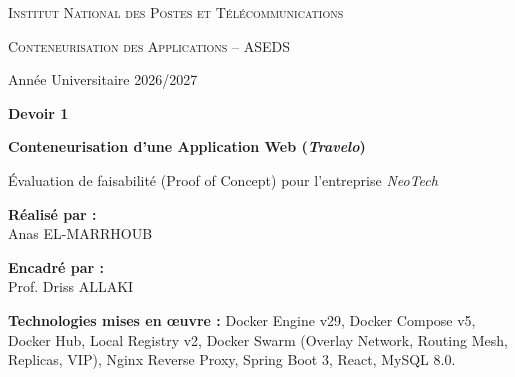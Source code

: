 \documentclass[11pt,a4paper]{article}
\begin{document}
\begin{titlepage}
  \centering
  {\scshape\LARGE Institut National des Postes et Télécommunications \par}
  \vspace{0.4cm}
  {\scshape\large Conteneurisation des Applications -- ASEDS \par}
  \vspace{0.2cm}
  {\large Année Universitaire 2026/2027 \par}
  \vspace{1.8cm}
  
  \begin{tcolorbox}[colback=inptblue, colframe=inptblue, arc=4mm, halign=center]
    \color{white}
    \vspace{0.5cm}
    {\Huge\bfseries Devoir 1 \par}
    \vspace{0.4cm}
    {\Large\bfseries Conteneurisation d'une Application Web (\textit{Travelo}) \par}
    \vspace{0.3cm}
    {\large Évaluation de faisabilité (Proof of Concept) pour l'entreprise \textit{NeoTech} \par}
    \vspace{0.5cm}
  \end{tcolorbox}
  
  \vspace{2.5cm}
  
  \begin{minipage}{0.48\textwidth}
    \begin{flushleft} \large
      \textbf{Réalisé par :}\\
      Anas \textsc{EL-MARRHOUB}
    \end{flushleft}
  \end{minipage}
  \hfill
  \begin{minipage}{0.48\textwidth}
    \begin{flushright} \large
      \textbf{Encadré par :}\\
      Prof. Driss \textsc{ALLAKI}
    \end{flushright}
  \end{minipage}
  
  \vfill
  
  \begin{tcolorbox}[colback=gray!10!white, colframe=gray!40!white, arc=2mm, halign=center]
    \small \textbf{Technologies mises en œuvre :} Docker Engine v29, Docker Compose v5, Docker Hub, Local Registry v2, Docker Swarm (Overlay Network, Routing Mesh, Replicas, VIP), Nginx Reverse Proxy, Spring Boot 3, React, MySQL 8.0.
  \end{tcolorbox}
  
  \vspace{0.5cm}
\end{titlepage}
\end{document}

